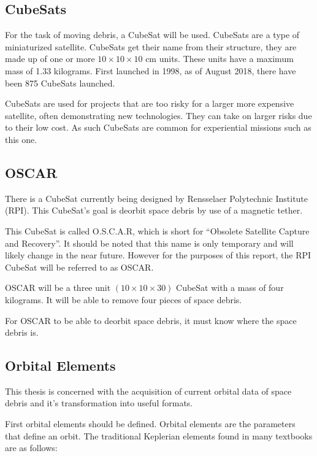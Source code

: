 \documentclass[12pt]{article}
\begin{document}
	\subsection{CubeSats}
	For the task of moving debris, a CubeSat will be used. CubeSats are a type of miniaturized satellite. CubeSats get their name from their structure, they are made up of one or more $10\times10\times10$ cm units.	These units have a maximum mass of 1.33 kilograms. First launched in 1998, as of August 2018, there have been 875 CubeSats launched\cite{nanosats_eu}. \par 
	
	
	
	CubeSats are used for projects that are too risky for a larger more expensive satellite, often demonstrating new technologies. They can take on larger risks due to their low cost. As such CubeSats are common for experiential missions such as this one.
	
	\subsection{OSCAR}
	There is a CubeSat currently being designed by Rensselaer Polytechnic Institute (RPI). This CubeSat's goal is deorbit space debris by use of a magnetic tether. \par 
	
	
	This CubeSat is called O.S.C.A.R, which is short for “Obsolete Satellite Capture and Recovery”. It should be noted that this name is only temporary and will likely change in the near future. However for the purposes of this report, the RPI CubeSat will be referred to as OSCAR.\par 
	
	OSCAR will be a three unit  $(10\times10\times30)$ CubeSat with a mass of four kilograms. It will be able to remove four pieces of space debris.\cite{paulT}
	
	For OSCAR to be able to deorbit space debris, it must know where the space debris is. 
	
	\subsection{Orbital Elements}
	
	This thesis is concerned with the acquisition of current orbital data of space debris and it's transformation into useful formats. 
	
	First orbital elements should be defined. Orbital elements are the parameters that define an orbit. The traditional Keplerian elements found in many textbooks are as follows: 
	
\end{document}
